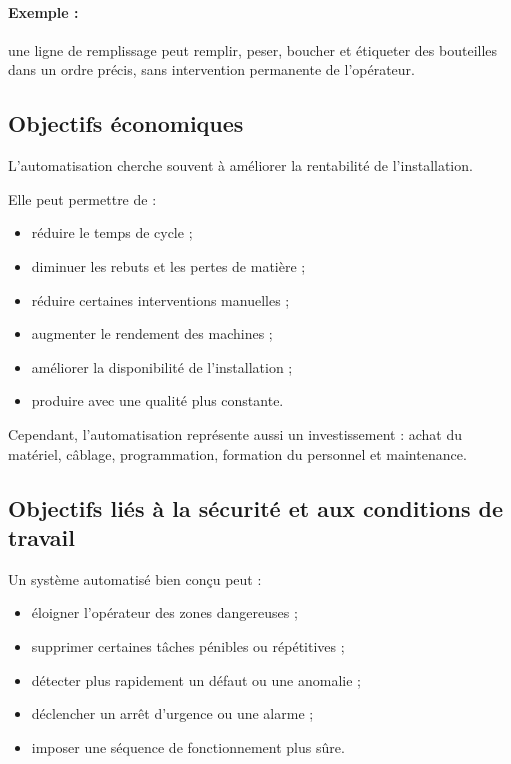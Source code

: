\paragraph{Exemple :} une ligne de remplissage peut remplir, peser, boucher et étiqueter des bouteilles dans un ordre précis, sans intervention permanente de l'opérateur.

\subsection{Objectifs économiques}

L'automatisation cherche souvent à améliorer la rentabilité de l'installation.

Elle peut permettre de :

\begin{itemize}
    \item réduire le temps de cycle ;
    \item diminuer les rebuts et les pertes de matière ;
    \item réduire certaines interventions manuelles ;
    \item augmenter le rendement des machines ;
    \item améliorer la disponibilité de l'installation ;
    \item produire avec une qualité plus constante.
\end{itemize}

Cependant, l'automatisation représente aussi un investissement : achat du matériel, câblage, programmation, formation du personnel et maintenance.

\subsection{Objectifs liés à la sécurité et aux conditions de travail}

Un système automatisé bien conçu peut :

\begin{itemize}
    \item éloigner l'opérateur des zones dangereuses ;
    \item supprimer certaines tâches pénibles ou répétitives ;
    \item détecter plus rapidement un défaut ou une anomalie ;
    \item déclencher un arrêt d'urgence ou une alarme ;
    \item imposer une séquence de fonctionnement plus sûre.
\end{itemize}

